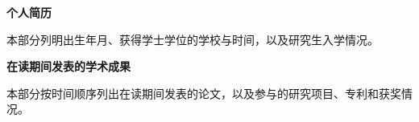 \noindent\textbf{个人简历}\par
本部分列明出生年月、获得学士学位的学校与时间，以及研究生入学情况。
\par\vspace{12bp}\noindent\textbf{在读期间发表的学术成果}\par
本部分按时间顺序列出在读期间发表的论文，以及参与的研究项目、专利和获奖情况。
